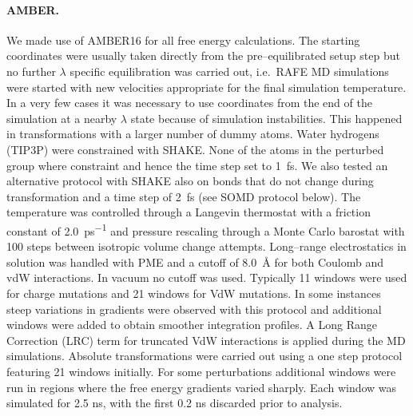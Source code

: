 \documentclass[journal=jctcce,manuscript=article]{achemso}
\begin{document}
\paragraph{AMBER.} We made use of AMBER16 for all free energy calculations. The
starting coordinates were usually taken directly from the pre--equilibrated
setup step but no further $\lambda$ specific equilibration was carried out,
i.e.\ RAFE MD simulations were started with new velocities appropriate for the
final simulation temperature.  In a very few cases it was necessary to use
coordinates from the end of the simulation at a nearby $\lambda$ state because
of simulation instabilities.  This happened in transformations with a larger
number of dummy atoms.  Water hydrogens (TIP3P) were constrained with SHAKE.
None of the atoms in the perturbed group where constraint and hence the time
step set to \SI{1}{fs}.  We also tested an alternative protocol with
SHAKE also on bonds that do not change during transformation and a time step of
\SI{2}{fs} (see SOMD protocol below).  The temperature was controlled through a
Langevin thermostat with a friction constant of \SI{2.0}{ps^{-1}} and pressure
rescaling through a Monte Carlo barostat with 100 steps between isotropic
volume change attempts.  Long--range electrostatics in solution was handled
with PME and a cutoff of \SI{8.0}{\angstrom} for both Coulomb and vdW
interactions.  In vacuum no cutoff was used.  Typically 11 windows
were used for charge mutations and 21 windows for VdW mutations.  In
some instances steep variations in gradients were observed with this
protocol and additional windows were added to obtain smoother
integration profiles.  A Long Range Correction (LRC) term for
truncated VdW interactions is applied during the MD simulations.
Absolute transformations were carried out using a one step protocol
featuring 21 windows initially.  For some perturbations additional
windows were run in regions where the free energy gradients varied
sharply.  Each window was simulated for 2.5 ns, with the first 0.2 ns
discarded prior to analysis.
\end{document}

